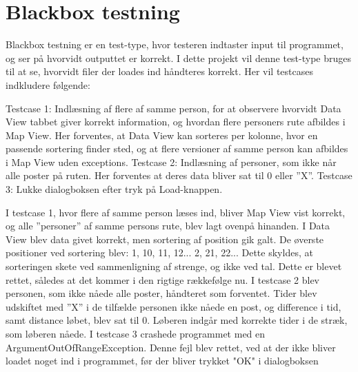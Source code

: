 \section{Blackbox testning}
Blackbox testning er en test-type, hvor testeren indtaster input til programmet, og ser på hvorvidt outputtet er korrekt. I dette projekt vil denne test-type bruges til at se, hvorvidt filer der loades ind håndteres korrekt. Her vil testcases indkludere følgende:

Testcase 1: Indlæsning af flere af samme person, for at observere hvorvidt Data View tabbet giver korrekt information, og hvordan flere personers rute afbildes i Map View. Her forventes, at Data View kan sorteres per kolonne, hvor en passende sortering finder sted, og at flere versioner af samme person kan afbildes i Map View uden exceptions.\newline
Testcase 2: Indlæsning af personer, som ikke når alle poster på ruten. Her forventes at deres data bliver sat til 0 eller ”X”.
Testcase 3: Lukke dialogboksen efter tryk på Load-knappen.


I testcase 1, hvor flere af samme person læses ind, bliver Map View vist korrekt, og alle ”personer” af samme persons rute, blev lagt ovenpå hinanden. I Data View blev data givet korrekt, men sortering af position gik galt. De øverste positioner ved sortering blev: 1, 10, 11, 12... 2, 21, 22... Dette skyldes, at sorteringen skete ved sammenligning af strenge, og ikke ved tal. Dette er blevet rettet, således at det kommer i den rigtige rækkefølge nu.\newline
I testcase 2 blev personen, som ikke nåede alle poster, håndteret som forventet. Tider blev udskiftet med ”X” i de tilfælde personen ikke nåede en post, og difference i tid, samt distance løbet, blev sat til 0. Løberen indgår med korrekte tider i de stræk, som løberen nåede.
I testcase 3 crashede programmet med en ArgumentOutOfRangeException. Denne fejl blev rettet, ved at der ikke bliver loadet noget ind i programmet, før der bliver trykket "OK" i dialogboksen 



